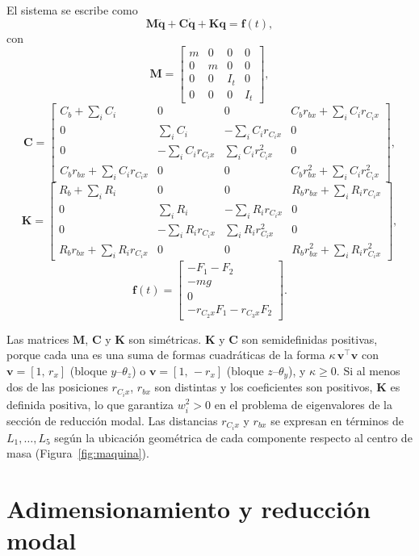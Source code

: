 El sistema se escribe como
\[
\mathbf M\ddot{\mathbf q}+\mathbf C\dot{\mathbf q}+\mathbf K\mathbf q=\mathbf f(t),
\]
con
\[
\mathbf M=\begin{bmatrix}
m&0&0&0\\
0&m&0&0\\
0&0&I_t&0\\
0&0&0&I_t
\end{bmatrix},
\]
\[
\mathbf C=\begin{bmatrix}
C_b+\sum_iC_i & 0 & 0 & C_br_{bx}+\sum_iC_ir_{C_ix}\\[2pt]
0 & \sum_iC_i & -\sum_iC_ir_{C_ix} & 0\\[2pt]
0 & -\sum_iC_ir_{C_ix} & \sum_iC_ir_{C_ix}^2 & 0\\[2pt]
C_br_{bx}+\sum_iC_ir_{C_ix} & 0 & 0 & C_br_{bx}^2+\sum_iC_ir_{C_ix}^2
\end{bmatrix},
\]
\[
\mathbf K=\begin{bmatrix}
R_b+\sum_iR_i & 0 & 0 & R_br_{bx}+\sum_iR_ir_{C_ix}\\[2pt]
0 & \sum_iR_i & -\sum_iR_ir_{C_ix} & 0\\[2pt]
0 & -\sum_iR_ir_{C_ix} & \sum_iR_ir_{C_ix}^2 & 0\\[2pt]
R_br_{bx}+\sum_iR_ir_{C_ix} & 0 & 0 & R_br_{bx}^2+\sum_iR_ir_{C_ix}^2
\end{bmatrix},
\]
\[
\mathbf f(t)=\begin{bmatrix}-F_1-F_2\\-mg\\0\\-r_{C_2x}F_1-r_{C_3x}F_2\end{bmatrix}.
\]

Las matrices $\mathbf M$, $\mathbf C$ y $\mathbf K$ son simétricas. $\mathbf K$ y $\mathbf C$ son semidefinidas positivas,
porque cada una es una suma de formas cuadráticas de la forma $\kappa\,\mathbf v^\top\mathbf v$ con $\mathbf v=[1,\,r_x]$ 
(bloque $y$--$\theta_z$) o $\mathbf v=[1,\,-r_x]$ (bloque $z$--$\theta_y$), y $\kappa\geq0$. Si al menos dos de las 
posiciones $r_{C_ix}$, $r_{bx}$ son distintas y los coeficientes son positivos, $\mathbf K$ es definida positiva, 
lo que garantiza $w_i^2>0$ en el problema de eigenvalores de la sección de reducción modal. Las distancias 
$r_{C_ix}$ y $r_{bx}$ se expresan en términos de $L_1,\ldots,L_5$ según la ubicación geométrica de cada componente 
respecto al centro de masa (Figura~\ref{fig:maquina}).

\section{Adimensionamiento y reducción modal}

